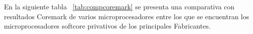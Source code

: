 % 

En la siguiente tabla ~\ref{tab:compcoremark} se presenta una comparativa con resultados Coremark de varios microprocesadores entre los que se
encuentran los microprocesadores softcore privativos de los principales Fabricantes.

